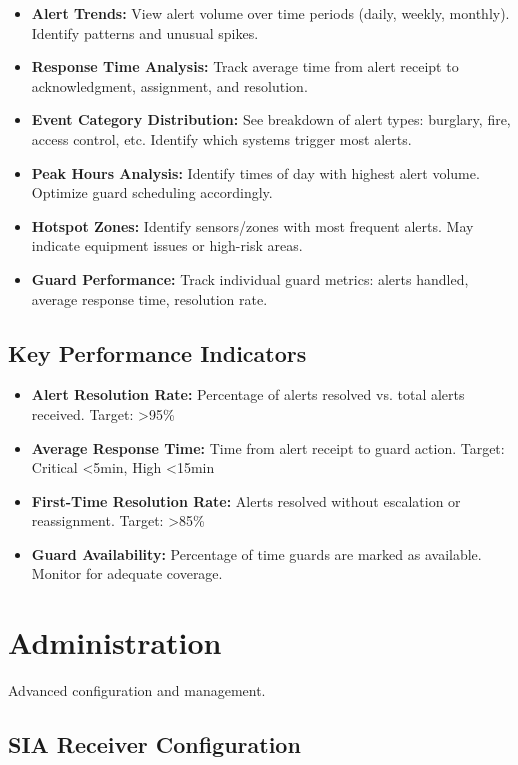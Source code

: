 \documentclass[12pt,a4paper]{article}
\begin{document}
\begin{itemize}
\item \textbf{Alert Trends:} View alert volume over time periods (daily, weekly, monthly). Identify patterns and unusual spikes.
\item \textbf{Response Time Analysis:} Track average time from alert receipt to acknowledgment, assignment, and resolution.
\item \textbf{Event Category Distribution:} See breakdown of alert types: burglary, fire, access control, etc. Identify which systems trigger most alerts.
\item \textbf{Peak Hours Analysis:} Identify times of day with highest alert volume. Optimize guard scheduling accordingly.
\item \textbf{Hotspot Zones:} Identify sensors/zones with most frequent alerts. May indicate equipment issues or high-risk areas.
\item \textbf{Guard Performance:} Track individual guard metrics: alerts handled, average response time, resolution rate.
\end{itemize}

\subsection{Key Performance Indicators}

\begin{itemize}
\item \textbf{Alert Resolution Rate:} Percentage of alerts resolved vs. total alerts received. Target: >95\%
\item \textbf{Average Response Time:} Time from alert receipt to guard action. Target: Critical <5min, High <15min
\item \textbf{First-Time Resolution Rate:} Alerts resolved without escalation or reassignment. Target: >85\%
\item \textbf{Guard Availability:} Percentage of time guards are marked as available. Monitor for adequate coverage.
\end{itemize}

\section{Administration}

Advanced configuration and management.

\subsection{SIA Receiver Configuration}
\end{document}
